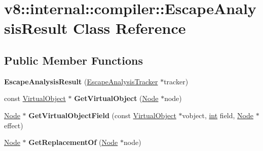 \hypertarget{classv8_1_1internal_1_1compiler_1_1EscapeAnalysisResult}{}\section{v8\+:\+:internal\+:\+:compiler\+:\+:Escape\+Analysis\+Result Class Reference}
\label{classv8_1_1internal_1_1compiler_1_1EscapeAnalysisResult}
\subsection*{Public Member Functions}
\begin{DoxyCompactItemize}
\item 
\mbox{\label{classv8_1_1internal_1_1compiler_1_1EscapeAnalysisResult_aa8ef3eecf62c8188e36ac503fc18ffc3}} 
{\bfseries Escape\+Analysis\+Result} (\mbox{\hyperlink{classv8_1_1internal_1_1compiler_1_1EscapeAnalysisTracker}{Escape\+Analysis\+Tracker}} $\ast$tracker)
\item 
\mbox{\label{classv8_1_1internal_1_1compiler_1_1EscapeAnalysisResult_a5174195805acc36c4de199f9291f43e4}} 
const \mbox{\hyperlink{classv8_1_1internal_1_1compiler_1_1VirtualObject}{Virtual\+Object}} $\ast$ {\bfseries Get\+Virtual\+Object} (\mbox{\hyperlink{classv8_1_1internal_1_1compiler_1_1Node}{Node}} $\ast$node)
\item 
\mbox{\label{classv8_1_1internal_1_1compiler_1_1EscapeAnalysisResult_a426e35c8f5184ab27e00064ec0553ce3}} 
\mbox{\hyperlink{classv8_1_1internal_1_1compiler_1_1Node}{Node}} $\ast$ {\bfseries Get\+Virtual\+Object\+Field} (const \mbox{\hyperlink{classv8_1_1internal_1_1compiler_1_1VirtualObject}{Virtual\+Object}} $\ast$vobject, \mbox{\hyperlink{classint}{int}} field, \mbox{\hyperlink{classv8_1_1internal_1_1compiler_1_1Node}{Node}} $\ast$effect)
\item 
\mbox{\label{classv8_1_1internal_1_1compiler_1_1EscapeAnalysisResult_ab461642c8656068b804066eabb528148}} 
\mbox{\hyperlink{classv8_1_1internal_1_1compiler_1_1Node}{Node}} $\ast$ {\bfseries Get\+Replacement\+Of} (\mbox{\hyperlink{classv8_1_1internal_1_1compiler_1_1Node}{Node}} $\ast$node)
\end{DoxyCompactItemize}


